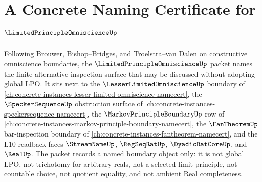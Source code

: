 \chapter{A Concrete Naming Certificate for $\LimitedPrincipleOmniscienceUp$}
\label{ch:concrete-instances-limited-principle-omniscience-namecert}

Following Brouwer, Bishop--Bridges, and Troelstra--van Dalen on constructive omniscience boundaries, the $\LimitedPrincipleOmniscienceUp$ packet names the finite alternative-inspection surface that may be discussed without adopting global LPO. It sits next to the $\LesserLimitedOmniscienceUp$ boundary of \autoref{ch:concrete-instances-lesser-limited-omniscience-namecert}, the $\SpeckerSequenceUp$ obstruction surface of \autoref{ch:concrete-instances-speckersequence-namecert}, the $\MarkovPrincipleBoundaryUp$ row of \autoref{ch:concrete-instances-markov-principle-boundary-namecert}, the $\FanTheoremUp$ bar-inspection boundary of \autoref{ch:concrete-instances-fantheorem-namecert}, and the L10 readback faces $\StreamNameUp$, $\RegSeqRatUp$, $\DyadicRatCoreUp$, and $\RealUp$. The packet records a named boundary object only: it is not global LPO, not trichotomy for arbitrary reals, not a selected limit principle, not countable choice, not quotient equality, and not ambient Real completeness.

